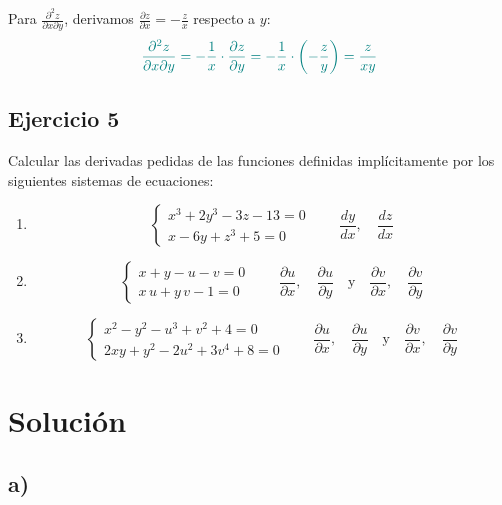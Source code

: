 \documentclass{article}
\begin{document}
  Para $\frac{\partial^2 z}{\partial x \partial y}$, derivamos $\frac{\partial z}{\partial x} = -\frac{z}{x}$ respecto a $y$:
  \begin{equation}\color{teal}
  \frac{\partial^2 z}{\partial x \partial y} = -\frac{1}{x} \cdot \frac{\partial z}{\partial y} = -\frac{1}{x} \cdot \left(-\frac{z}{y}\right) = \frac{z}{xy}
  \end{equation}
  

\newpage
\subsection{Ejercicio 5}
Calcular las derivadas pedidas de las funciones definidas implícitamente por los siguientes sistemas de ecuaciones:

\begin{enumerate}
  \item
    \[
    \begin{cases}
      x^3 + 2y^3 - 3z - 13 = 0\\[4pt]
      x - 6y + z^3 + 5 = 0
    \end{cases}
    \qquad
    \frac{dy}{dx},\quad \frac{dz}{dx}
    \]
  \item
    \[
    \begin{cases}
      x + y - u - v = 0\\[4pt]
      x\,u + y\,v - 1 = 0
    \end{cases}
    \qquad
    \frac{\partial u}{\partial x},\quad \frac{\partial u}{\partial y}
    \quad\text{y}\quad
    \frac{\partial v}{\partial x},\quad \frac{\partial v}{\partial y}
    \]
  \item
    \[
    \begin{cases}
      x^2 - y^2 - u^3 + v^2 + 4 = 0\\[4pt]
      2xy + y^2 - 2u^2 + 3v^4 + 8 = 0
    \end{cases}
    \qquad
    \frac{\partial u}{\partial x},\quad \frac{\partial u}{\partial y}
    \quad\text{y}\quad
    \frac{\partial v}{\partial x},\quad \frac{\partial v}{\partial y}
    \]
\end{enumerate}

\newpage
\section*{Solución}

\subsection*{a)}
\end{document}
